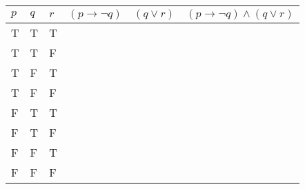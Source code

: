 \documentclass{article}
\begin{document}
\begin{table}[]
\centering
\begin{tabular}{|l|l|l||l|l|l|}
\hline
$p$ & $q$ & $r$ & $(p \rightarrow \neg q)$ & $(q \vee r)$ & $(p \rightarrow \neg q) \wedge (q \vee r)$ \\ \hline
  T  &  T  &  T  &      &      &     \\ \hline
  T  &  T  &  F  &      &      &     \\ \hline
  T  &  F  &  T  &      &      &     \\ \hline
  T  &  F  &  F  &      &      &     \\ \hline
  F  &  T  &  T  &      &      &     \\ \hline
  F  &  T  &  F  &      &      &     \\ \hline
  F  &  F  &  T  &      &      &     \\ \hline
  F  &  F  &  F  &      &      &     \\ \hline
\end{tabular}
\end{table}
\end{document}
